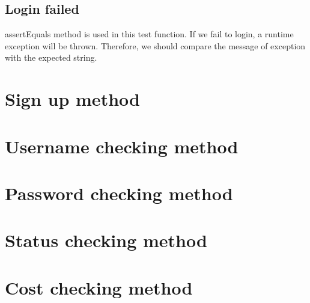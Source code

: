 \documentclass[a4paper]{report}
\begin{document}
\subsection{Login failed}
\par assertEquals method is used in this test function.  If we fail to login, a runtime exception will be thrown. Therefore, we should compare the message of exception with the expected string.

\section{Sign up method}



\section{Username checking method}




\section{Password checking method}




\section{Status checking method}



\section{Cost checking method}
\end{document}
